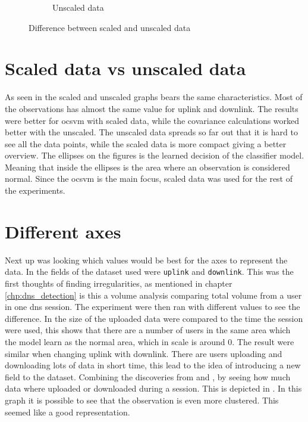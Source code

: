 \begin{figure}[hbp]
\begin{subfigure}[b]{0.4\textwidth}
		\caption{Unscaled data}
		\label{fig:unscaledUpDown}
	\end{subfigure}
\caption{Difference between scaled and unscaled data}
\label{fig:scaledVSUnscaledUpDown}
\end{figure}


\section{Scaled data vs unscaled data}
As seen in  the scaled and unscaled graphs bears the same characteristics. Most of the observations has almost the same value for uplink and downlink. 
The results were better for \gls{ocsvm} with scaled data, while the covariance calculations worked better with the unscaled. The unscaled data spreads so far out that it is hard to see all the data points, while the scaled data is more compact giving a better overview. The ellipses on the figures is the learned decision of the classifier model. Meaning that inside the ellipses is the area where an observation is considered normal. Since the \gls{ocsvm} is the main focus, scaled data was used for the rest of the experiments.

\section{Different axes}
Next up was looking which values would be best for the axes to represent the data. In  the fields of the dataset used were \texttt{uplink} and \texttt{downlink}. This was the first thoughts of finding irregularities, as mentioned in chapter \ref{chp:dns_detection} is this a volume analysis comparing total volume from a user in one \gls{dns} session. The experiment were then ran with different values to see the difference. In  the size of the uploaded data were compared to the time the session were used, this shows that there are a number of users in the same area which the model learn as the normal area, which in scale is around 0. The result were similar when changing uplink with downlink. There are users uploading and downloading lots of data in short time, this lead to the idea of introducing a new field to the dataset. Combining the discoveries from  and , by seeing how much data where uploaded or downloaded during a session. This is depicted in . In this graph it is possible to see that the observation is even more clustered. This seemed like a good representation. 


